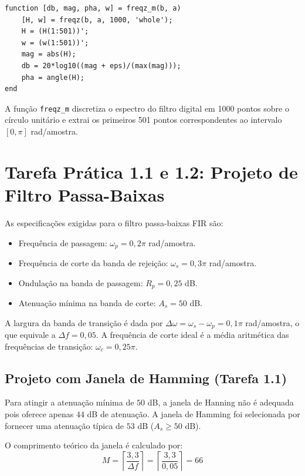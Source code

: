 \documentclass[10pt, conference]{IEEEtran}
\begin{document}
\begin{lstlisting}[caption={Função para cálculo da resposta em frequência em escala dB.}]
function [db, mag, pha, w] = freqz_m(b, a)
    [H, w] = freqz(b, a, 1000, 'whole');
    H = (H(1:501))';
    w = (w(1:501))';
    mag = abs(H);
    db = 20*log10((mag + eps)/(max(mag)));
    pha = angle(H);
end
\end{lstlisting}

A função \texttt{freqz\_m} discretiza o espectro do filtro digital em 1000 pontos sobre o círculo unitário e extrai os primeiros 501 pontos correspondentes ao intervalo $[0, \pi]$ rad/amostra.

\section{Tarefa Prática 1.1 e 1.2: Projeto de Filtro Passa-Baixas}
As especificações exigidas para o filtro passa-baixas FIR são:
\begin{itemize}
    \item Frequência de passagem: $\omega_p = 0,2\pi$ rad/amostra.
    \item Frequência de corte da banda de rejeição: $\omega_s = 0,3\pi$ rad/amostra.
    \item Ondulação na banda de passagem: $R_p = 0,25$ dB.
    \item Atenuação mínima na banda de corte: $A_s = 50$ dB.
\end{itemize}

A largura da banda de transição é dada por $\Delta\omega = \omega_s - \omega_p = 0,1\pi$ rad/amostra, o que equivale a $\Delta f = 0,05$. A frequência de corte ideal é a média aritmética das frequências de transição: $\omega_c = 0,25\pi$.

\subsection{Projeto com Janela de Hamming (Tarefa 1.1)}
Para atingir a atenuação mínima de $50$ dB, a janela de Hanning não é adequada pois oferece apenas $44$ dB de atenuação. A janela de Hamming foi selecionada por fornecer uma atenuação típica de $53$ dB ($A_s \geq 50$ dB).

O comprimento teórico da janela é calculado por:
\begin{equation}
M = \left\lceil \frac{3,3}{\Delta f} \right\rceil = \left\lceil \frac{3,3}{0,05} \right\rceil = 66
\end{equation}
\end{document}
